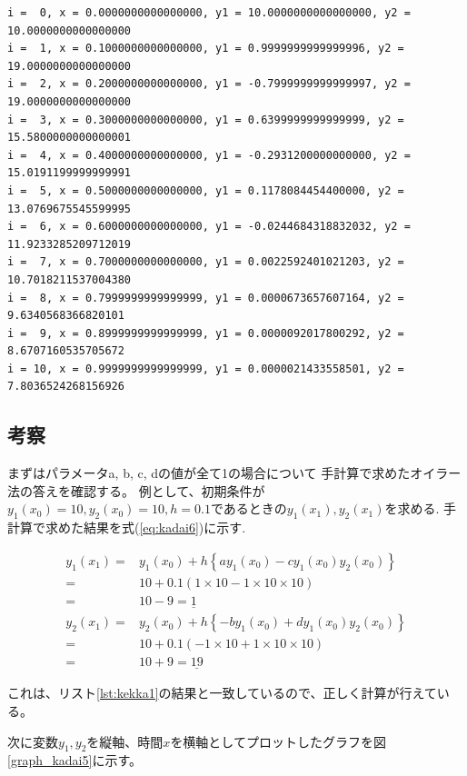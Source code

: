 \begin{lstlisting}[style=text,caption=課題1の実行結果,label=lst:kekka1]
i =  0, x = 0.0000000000000000, y1 = 10.0000000000000000, y2 = 10.0000000000000000
i =  1, x = 0.1000000000000000, y1 = 0.9999999999999996, y2 = 19.0000000000000000
i =  2, x = 0.2000000000000000, y1 = -0.7999999999999997, y2 = 19.0000000000000000
i =  3, x = 0.3000000000000000, y1 = 0.6399999999999999, y2 = 15.5800000000000001
i =  4, x = 0.4000000000000000, y1 = -0.2931200000000000, y2 = 15.0191199999999991
i =  5, x = 0.5000000000000000, y1 = 0.1178084454400000, y2 = 13.0769675545599995
i =  6, x = 0.6000000000000000, y1 = -0.0244684318832032, y2 = 11.9233285209712019
i =  7, x = 0.7000000000000000, y1 = 0.0022592401021203, y2 = 10.7018211537004380
i =  8, x = 0.7999999999999999, y1 = 0.0000673657607164, y2 = 9.6340568366820101
i =  9, x = 0.8999999999999999, y1 = 0.0000092017800292, y2 = 8.6707160535705672
i = 10, x = 0.9999999999999999, y1 = 0.0000021433558501, y2 = 7.8036524268156926
\end{lstlisting}

\subsection{考察}
まずはパラメータa, b, c, dの値が全て1の場合について
手計算で求めたオイラー法の答えを確認する。
例として、初期条件が$y_1(x_0)=10,y_2(x_0)=10,h=0.1$であるときの$y_1(x_1),y_2(x_1)$を求める.
手計算で求めた結果を式(\ref{eq:kadai6})に示す.

\begin{equation*}
\begin{split}
y_1(x_1)=&y_1(x_0)+ h\left\{ ay_{1}\left( x_{0}\right) -cy_{1}\left( x_{0}\right) y_{2}\left( x_{0}\right) \right\} \\
        =&10+0.1(1\times10-1\times10\times10)\\
        =&10-9=\underline{1}\\
y_2(x_1)=&y_2(x_0)+ h\left\{ -by_{1}\left( x_{0}\right) +dy_{1}\left( x_{0}\right) y_{2}\left( x_{0}\right) \right\} \\
=&10+0.1(-1\times10+1\times10\times10)\\
=&10+9=\underline{19}      
\end{split}
\label{eq:kadai6}
\end{equation*}

これは、リスト\ref{lst:kekka1}の結果と一致しているので、正しく計算が行えている。

次に変数$y_1,y_2$を縦軸、時間$x$を横軸としてプロットしたグラフを図\ref{graph_kadai5}に示す。

